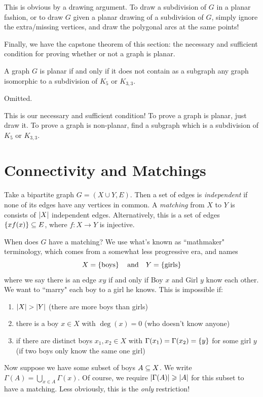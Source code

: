 \documentclass{article}
\begin{document}
\begin{prf}
    This is obvious by a drawing argument. To draw a subdivision of $G$ in a planar fashion, or to draw $G$ given a planar drawing of a subdivision of $G$, simply ignore the extra/missing vertices, and draw the polygonal arcs at the same points!
\end{prf}

Finally, we have the capstone theorem of this section: the necessary and sufficient condition for proving whether or not a graph is planar.

\begin{theorem}
    \label{kuratowskis-theorem}
    A graph $G$ is planar if and only if it does not contain as a subgraph any graph isomorphic to a subdivision of $K_5$ or $K_{3,3}$.
\end{theorem}

\begin{prf}
    Omitted.
\end{prf}

This is our necessary and sufficient condition! To prove a graph is planar, just draw it. To prove a graph is non-planar, find a subgraph which is a subdivision of $K_5$ or $K_{3,3}$.


\pagebreak
\section{Connectivity and Matchings}

\begin{definition}
    Take a bipartite graph $G = (X \cup Y, E)$. Then a set of edges is \textit{independent} if none of its edges have any vertices in common.  A \textit{matching} from $X$ to $Y$ is consists of $\left\lvert X \right\rvert$ independent edges. Alternatively, this is a set of edges $\left\lbrace xf(x) \right\rbrace \subseteq E$, where $f: X \to Y$ is injective.
\end{definition}

When does $G$ have a matching? We use what's known as ``mathmaker" terminology, which comes from a somewhat less progressive era, and names
\[
X = \left\lbrace \text{boys} \right\rbrace \quad \text{and} \quad Y = \left\lbrace \text{girls} \right\rbrace
\]
where we say there is an edge $xy$ if and only if Boy $x$ and Girl $y$ know each other. We want to ``marry" each boy to a girl he knows. This is impossible if:
\begin{enumerate}
	\item $\left\lvert X \right\rvert > \left\lvert Y \right\rvert$ (there are more boys than girls)
    \item there is a boy $x \in X$ with $\deg (x) = 0$ (who doesn't know anyone)
    \item if there are distinct boys $x_1, x_2 \in X$ with $\Gamma(x_1) = \Gamma(x_2) = \left\lbrace y \right\rbrace$ for some girl $y$ (if two boys only know the same one girl)
\end{enumerate}
Now suppose we have some subset of boys $A \subseteq X$. We write $\Gamma(A) = \bigcup_{x \in A} \Gamma(x)$. Of course, we require $\left\lvert \Gamma(A) \right\rvert \geqslant \left\lvert A \right\rvert$ for this subset to have a matching. Less obviously, this is the \textit{only} restriction!
\end{document}
